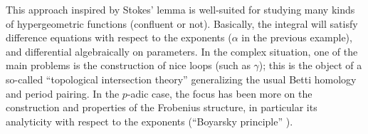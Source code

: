 \begin{para}
 This approach inspired by Stokes' lemma is well-suited for studying
 many kinds of hypergeometric functions (confluent or not). Basically,
 the integral will satisfy difference equations with respect to the
 exponents ($\alpha$ in the previous example), and differential
 algebraically on parameters. In the complex situation, one of the main
 problems is the construction of nice loops (such as $\gamma$); this is
 the object of a so-called ``topological intersection theory''
 generalizing the usual Betti homology and period pairing. In the
 $p$-adic case, the focus has been more on the construction and
 properties of the Frobenius structure, in particular its analyticity
 with respect to the exponents (``Boyarsky principle'' \cite{otbp}).
\end{para}

